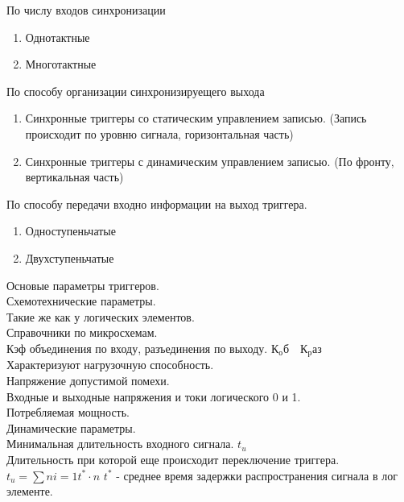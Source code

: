 По числу входов синхронизации
\begin{enumerate}
  \item Однотактные
  \item Многотактные
\end{enumerate}

По способу организации синхронизируещего выхода\\

\begin{enumerate}
  \item Синхронные триггеры со статическим управлением записью. (Запись происходит по уровню сигнала, горизонтальная часть)
  \item Синхронные триггеры с динамическим управлением записью. (По фронту, вертикальная часть)
\end{enumerate}

По способу передачи входно информации на выход триггера.\\
\begin{enumerate}
  \item Одноступеньчатые
  \item Двухступеньчатые
\end{enumerate}

Основые параметры триггеров.\\
Схемотехнические параметры.\\

Такие же как у логических элементов.\\
Справочники по микросхемам.\\

Кэф объединения по входу, разъединения по выходу. $К_об  \quad К_раз$\\
Характеризуют нагрузочную способность.\\


Напряжение допустимой помехи. \\
Входные и выходные напряжения и токи логического 0 и 1. \\

Потребляемая мощность.\\


Динамические параметры.\\

Минимальная длительность входного сигнала. $t_u$ \\
Длительность при которой еще происходит переключение триггера.\\
$ t_u = \sum{n}{i = 1} t^* \cdot n  $
$t^*$ - среднее время задержки распространения сигнала  в лог элементе.

